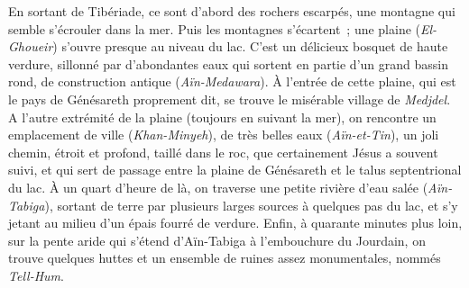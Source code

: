\documentclass[french,twoside]{book} %
\begin{document}
En sortant de Tibériade, ce sont d’abord des rochers escarpés, une montagne qui semble s’écrouler dans la mer. Puis les montagnes s’écartent ; une plaine ({\itshape El-Ghoueir}) s’ouvre presque au niveau du lac. C’est un délicieux bosquet de haute verdure, sillonné par d’abondantes eaux qui sortent en partie d’un grand bassin rond, de construction antique ({\itshape Aïn-Medawara}). À l’entrée de cette plaine, qui est le pays de Génésareth proprement dit, se trouve le misérable village de {\itshape Medjdel}. A l’autre extrémité de la plaine (toujours en suivant la mer), on rencontre un emplacement de ville ({\itshape Khan-Minyeh}), de très belles eaux ({\itshape Aïn-et-Tin}), un joli chemin, étroit et profond, taillé dans le roc, que certainement Jésus a souvent suivi, et qui sert de passage entre la plaine de Génésareth et le talus septentrional du lac. À un quart d’heure de là, on traverse une petite rivière d’eau salée ({\itshape Aïn-Tabiga}), sortant de terre par plusieurs larges sources à quelques pas du lac, et s’y jetant au milieu d’un épais fourré de verdure. Enfin, à quarante minutes plus loin, sur la pente aride qui s’étend d’Aïn-Tabiga à l’embouchure du Jourdain, on trouve quelques huttes et un ensemble de ruines assez monumentales, nommés {\itshape Tell-Hum}.\par
\end{document}
